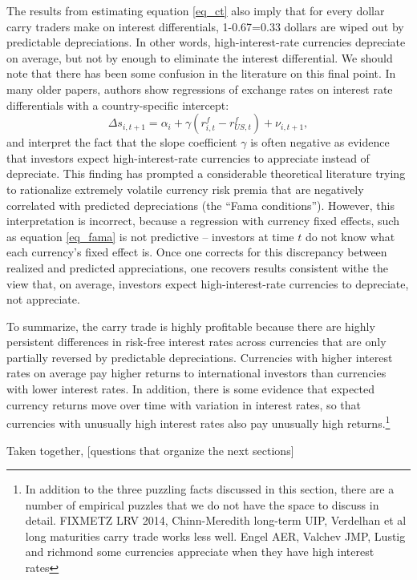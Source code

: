 The results from estimating equation \eqref{eq_ct} also imply that for 
every dollar carry traders make on interest differentials, 1-0.67=0.33 
dollars are wiped out by predictable depreciations. In other words,
high-interest-rate currencies depreciate on average, but not by 
enough to eliminate the interest differential. We should note that 
there has been some confusion in the literature on this final point. 
In many older papers, authors show regressions of exchange rates on 
interest rate differentials with a country-specific intercept:
\begin{equation}
    \Delta s_{i,t+1} 
    = \alpha_i + \gamma \left(r^f_{i, t} - r^f_{US, t}\right) + \nu_{i, t+1},
\label{eq_fama} 
\end{equation}
and interpret the fact that the slope coefficient $\gamma$ is often 
negative as evidence that investors expect high-interest-rate 
currencies to appreciate instead of depreciate. This finding has 
prompted a considerable theoretical literature trying to rationalize 
extremely volatile currency risk premia that are negatively correlated 
with predicted depreciations (the ``Fama conditions''). However, this
interpretation is incorrect, because a regression with currency fixed
effects, such as equation \eqref{eq_fama} is not predictive -- investors at
time $t$ do not know what each currency's fixed effect is. Once one
corrects for this discrepancy between realized and predicted
appreciations, one recovers results consistent withe the view that, on
average, investors expect high-interest-rate currencies to depreciate,
not appreciate.

To summarize, the carry trade is highly profitable because there are 
highly persistent differences in risk-free interest rates across 
currencies that are only partially reversed by predictable 
depreciations. Currencies with higher interest rates on average pay 
higher returns to international investors than currencies with lower 
interest rates. In addition, there is some evidence that expected 
currency returns move over time with variation in interest rates, 
so that currencies with unusually high interest rates also pay 
unusually high returns.\footnote{In addition to the three puzzling
facts discussed in this section, there are a number of empirical 
puzzles that we do not have the space to discuss in detail. 
FIXMETZ LRV 2014, Chinn-Meredith long-term UIP, Verdelhan et al 
long maturities carry trade works less well. Engel AER, Valchev JMP, 
Lustig and richmond some currencies appreciate when they have 
high interest rates}

Taken together, [questions that organize the next sections]

